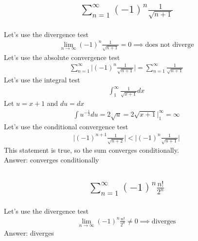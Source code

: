 \documentclass{article}
\begin{document}
\subsection{
	\begin{align*}
		\sum_{n = 1}^{\infty} (-1)^n \frac{1}{\sqrt{n + 1}}
	\end{align*}
}
Let's use the divergence test
\begin{align*}
	\lim_{n \to \infty} {(-1)^n \frac{1}{\sqrt{n + 1}}} = 0 \implies \text{does not diverge}
\end{align*}
Let's use the absolute convergence test
\begin{align*}
	\sum_{n = 1}^{\infty} \bigg| (-1)^n \frac{1}{\sqrt{n + 1}} \bigg| = \sum_{n = 1}^{\infty}  \frac{1}{\sqrt{n + 1}}
\end{align*}
Let's use the integral test
\begin{align*}
	\int_1^{\infty} \frac{1}{\sqrt{x + 1}} dx
\end{align*}
Let $u = x + 1$ and $du = dx$
\begin{align*}
	\int {u^{-\frac{1}{2}}} du = 2\sqrt{u} = 2\sqrt{x + 1} \bigg|_1^{\infty} = \infty
\end{align*}
Let's use the conditional convergence test
\begin{align*}
	 \bigg| (-1)^{n + 1} \frac{1}{\sqrt{n + 2}} \bigg| <  \bigg| (-1)^n \frac{1}{\sqrt{n + 1}} \bigg|
\end{align*}
This statement is true, so the sum converges conditionally. \\[10pt]
Answer: converges conditionally

\subsection{
	\begin{align*}
		\sum_{n = 1}^{\infty} (-1)^n \frac{n!}{2^n}
	\end{align*}
}
Let's use the divergence test
\begin{align*}
	\lim_{n \to \infty} {(-1)^n \frac{n!}{2^n}} \neq 0 \implies \text{diverges}
\end{align*}
Answer: diverges


\end{document}
